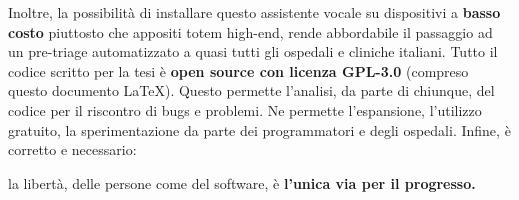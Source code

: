 Inoltre, la possibilità di installare questo assistente vocale su dispositivi a \textbf{basso costo} piuttosto che appositi totem high-end, rende abbordabile il passaggio ad un pre-triage automatizzato a quasi tutti gli ospedali e cliniche italiani.
Tutto il codice scritto per la tesi è \textbf{open source con licenza GPL-3.0} (compreso questo documento \LaTeX).
Questo permette l'analisi, da parte di chiunque, del codice per il riscontro di bugs e problemi. Ne permette l'espansione, l'utilizzo gratuito, la sperimentazione da parte dei programmatori e degli ospedali. Infine, è corretto e necessario:
\begin{center}
    la libertà, delle persone come del software, è \textbf{l'unica via per il progresso.}
\end{center}
